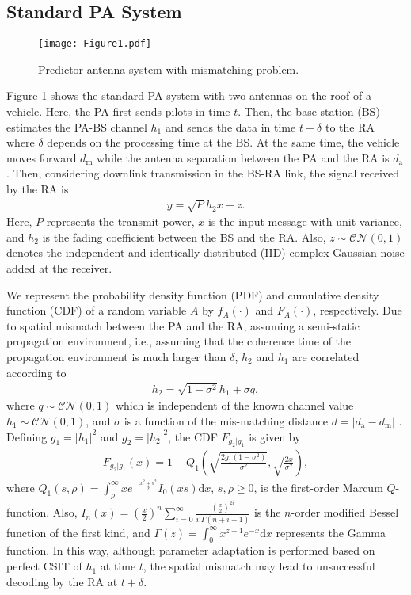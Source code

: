 \subsection{Standard PA System}
\begin{figure}
\centering
  \texttt{[image: Figure1.pdf]}\\
\caption{Predictor antenna system with mismatching problem.}\label{ARQmodel}
\end{figure}
Figure \ref{ARQmodel} shows the standard PA system with two antennas on the roof of a vehicle. Here, the PA first sends pilots in time $t$. Then, the base station (BS) estimates the PA-BS channel $h_1$ and sends the data in time $t+\delta$ to the RA where  $\delta$ depends on the processing time at the BS. At the same time, the vehicle moves forward $d_\text{m}$ while the antenna separation between the PA and the RA is $d_\text{a}$. Then, considering downlink transmission in the BS-RA link, the  signal received by the RA is
\begin{align}\label{eq_Y}
y = \sqrt{P}h_2 x + z.
\end{align}
Here, $P$ represents the transmit power, $x$ is the input message with unit variance, and $h_2$ is the fading coefficient between the BS and the RA. Also, $z \sim \mathcal{CN}(0,1)$ denotes the independent and identically distributed (IID) complex Gaussian noise added at the receiver.

We represent the probability density function (PDF) and cumulative density function (CDF) of a random variable $A$ by $f_A(\cdot)$ and $F_A(\cdot)$, respectively.  Due to spatial mismatch between the PA and the RA, assuming a semi-static propagation environment, i.e., assuming that the coherence time of the propagation environment is much larger than $\delta$, $h_2$ and $h_1$ are correlated according to \cite[Eq. 5]{Guo2019WCLrate} 
\begin{align}\label{eq_H}
    h_2 = \sqrt{1-\sigma^2} h_1 + \sigma q,
\end{align}
where $q \sim \mathcal{CN}(0,1)$ which is independent of the known channel value $h_1\sim \mathcal{CN}(0,1)$, and $\sigma$ is a function of the mis-matching distance $d = |d_\text{a}-d_\text{m}|$ \cite[Eq. 4]{Guo2019WCLrate}. Defining $g_1 = |h_1|^2$ and $ g_2 = |h_2|^2$, the CDF $F_{g_2|g_1}$ is given by
\begin{align}\label{eq_cdf}
    F_{g_2|g_1}(x) = 1 - Q_1\left( \sqrt{\frac{2g_1(1-\sigma^2)}{\sigma^2}}, \sqrt{\frac{2x}{\sigma^2}}  \right),
\end{align}
where $Q_1(s,\rho) = \int_{\rho}^{\infty} xe^{-\frac{x^2+s^2}{2}}I_0(xs)\text{d}x$, $s, \rho \ge 0$, is the first-order Marcum $Q$-function. Also, $I_n(x) = (\frac{x}{2})^n \sum_{i=0}^{\infty}\frac{(\frac{x}{2})^{2i} }{i!\Gamma(n+i+1)}$ is the $n$-order modified Bessel function of the first kind, and $\Gamma(z) = \int_0^{\infty} x^{z-1}e^{-x} \mathrm{d}x$ represents the Gamma function. In this way, although parameter adaptation is performed based on perfect CSIT of $h_1$ at time $t$, the spatial mismatch may lead to unsuccessful decoding by the RA  at $t+\delta$.


